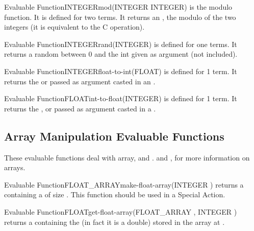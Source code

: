 \begin{typeefa}{Evaluable Function}{INTEGER}{mod}{(INTEGER INTEGER)}
is the modulo function. It is defined for two  terms. It returns an
, the modulo of the two integers (it is equivalent to the C
\code{\%} operation).
\end{typeefa}

\begin{typeefa}{Evaluable Function}{INTEGER}{rand}{(INTEGER)}
 is defined for one  terms. It returns a random
 between 0 and the int given as argument (not included).
\end{typeefa}

\begin{typeefa}{Evaluable Function}{INTEGER}{float-to-int}{({FLOAT})}
is defined for 1 term. It returns the  or  passed as argument casted in
an . 
\end{typeefa}

\begin{typeefa}{Evaluable Function}{FLOAT}{int-to-float}{({INTEGER})}
is defined for 1 term. It returns the  ,  or  passed as argument casted
in a .
\end{typeefa}

\subsection{Array Manipulation Evaluable Functions}

These evaluable functions deal with array,  and
.  and , for more information on arrays.

\begin{typeefa}{Evaluable Function}{FLOAT\_ARRAY}{make-float-array}{(INTEGER )}
returns a  containing a  of size .
This function should be used in a Special Action.
\end{typeefa}

\begin{typeefa}{Evaluable Function}{FLOAT}{get-float-array}{(FLOAT\_ARRAY
, INTEGER )}
returns a  containing the   (in fact it is a double)
stored in the array  at  .
\end{typeefa}

